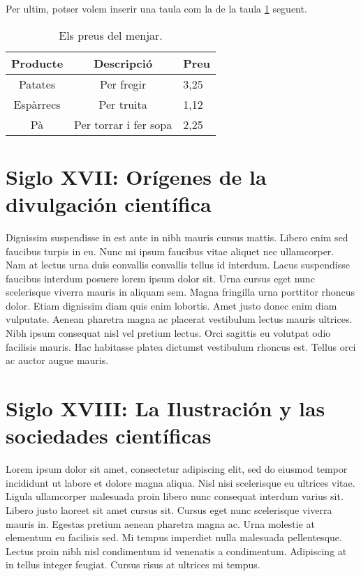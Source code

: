 Per ultim, potser volem inserir una taula com la de la taula \ref{taula:preus_menjar} seguent.
\begin{table}[h!]
\centering
\begin{tabular}{|c|c|l|}
    \hline
    Producte & Descripció & Preu \\
    \hline
    Patates & Per fregir & 3,25 \\
    Espàrrecs & Per truita & 1,12 \\
    Pà & Per torrar i fer sopa & 2,25 \\
    \hline
\end{tabular}
\caption{Els preus del menjar.}
\label{taula:preus_menjar}
\end{table}

\section{Siglo XVII: Orígenes de la divulgación científica}
Dignissim suspendisse in est ante in nibh mauris cursus mattis. Libero enim sed faucibus turpis in eu. Nunc mi ipsum faucibus vitae aliquet nec ullamcorper. Nam at lectus urna duis convallis convallis tellus id interdum. Lacus suspendisse faucibus interdum posuere lorem ipsum dolor sit. Urna cursus eget nunc scelerisque viverra mauris in aliquam sem. Magna fringilla urna porttitor rhoncus dolor. Etiam dignissim diam quis enim lobortis. Amet justo donec enim diam vulputate. Aenean pharetra magna ac placerat vestibulum lectus mauris ultrices. Nibh ipsum consequat nisl vel pretium lectus. Orci sagittis eu volutpat odio facilisis mauris. Hac habitasse platea dictumst vestibulum rhoncus est. Tellus orci ac auctor augue mauris.

\section{Siglo XVIII: La Ilustración y las sociedades científicas}
Lorem ipsum dolor sit amet, consectetur adipiscing elit, sed do eiusmod tempor incididunt ut labore et dolore magna aliqua. Nisl nisi scelerisque eu ultrices vitae. Ligula ullamcorper malesuada proin libero nunc consequat interdum varius sit. Libero justo laoreet sit amet cursus sit. Cursus eget nunc scelerisque viverra mauris in. Egestas pretium aenean pharetra magna ac. Urna molestie at elementum eu facilisis sed. Mi tempus imperdiet nulla malesuada pellentesque. Lectus proin nibh nisl condimentum id venenatis a condimentum. Adipiscing at in tellus integer feugiat. Cursus risus at ultrices mi tempus.

